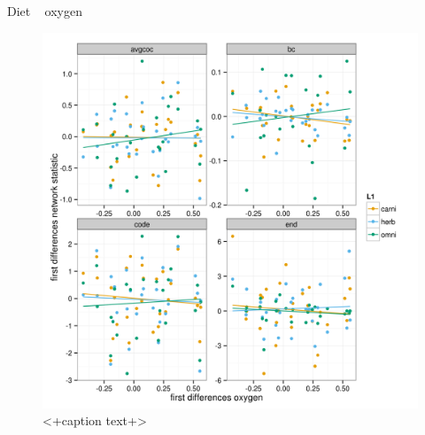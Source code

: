 \documentclass[final]{beamer}\usepackage[]{graphicx}\usepackage[]{color}
\newlength{\onecolwid}
\newlength{\twocolwid}
\begin{document}
\begin{frame}[t]
\begin{columns}[t]
\begin{column}{\twocolwid}
\begin{columns}[t,totalwidth = \twocolwid]
        \begin{column}{\onecolwid}
          \begin{block}{Diet ~ oxygen}
            \begin{figure}[ht]
              \centering
              \includegraphics[height = 0.2\textheight]{figure/dt_oxy}
              \caption{<+caption text+>}
              \label{fig:cor}
            \end{figure}
          \end{block}
        \end{column}
      \end{columns}


    \end{column}


\end{columns}
\end{frame}
\end{document}
